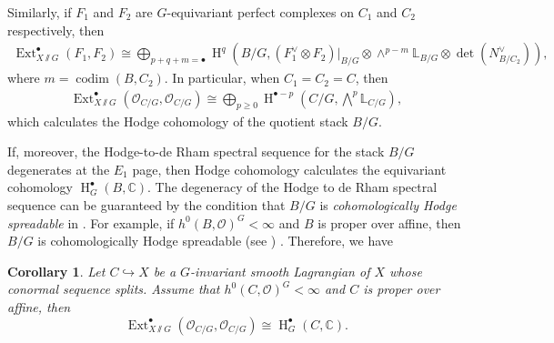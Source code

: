 \documentclass[12pt]{amsart}
\newtheorem{corollary}[theorem]{Corollary}
\theoremstyle{definition}
\theoremstyle{remark}
\numberwithin{equation}{section}
\newcommand{\CC}{\mathbb{C}}
\newcommand{\LL}{\mathbb{L}}
\newcommand{\TT}{\mathbb{T}}
\newcommand{\shO}{\mathcal{O}}
\newcommand{\codim}{\operatorname{codim}}
\newcommand{\Ext}{\operatorname{Ext}}
\newcommand{\Sym}{\operatorname{Sym}}
\newcommand{\Hdot}{\operatorname{H}}
\begin{document}
Similarly, if $F_1$ and $F_2$ are $G$-equivariant perfect complexes on $C_1$ and $C_2$ respectively, then
\begin{align}\label{eq: generalexteq}
    \Ext^{\bullet}_{X\sslash  G}(F_1,F_2)\cong\bigoplus_{p+q+m=\bullet}
\Hdot^q(B/G, (F_1^{\vee}\otimes F_2)|_{B/G}\otimes \wedge^{p-m}\LL_{B/G}\otimes \det(N_{B/C_2}^{\vee})),
\end{align}
where $m=\codim(B, C_2)$.
In particular, when $C_1=C_2=C$, then 
\begin{align*}
\Ext_{X\sslash  G}^{\bullet}(\shO_{C/G},\shO_{C/G})\cong  \bigoplus_{p\geq 0} \Hdot^{\bullet-p}(C/G, \bigwedge^p \LL_{C/G}),
\end{align*}
which calculates the Hodge cohomology of the quotient stack $B/G$.

If, moreover, the Hodge-to-de Rham spectral sequence for the stack $B/G$ degenerates at the $E_1$ page, then Hodge cohomology calculates the equivariant cohomology $\Hdot^{\bullet}_G(B, \CC)$. The degeneracy of the Hodge to de Rham spectral sequence can be guaranteed by the condition that $B/G$ is \emph{cohomologically Hodge spreadable} in \cite{kubrak2022hodge}. For example, if $h^0(B, \shO)^G<\infty$ and $B$ is proper over affine, then $B/G$ is cohomologically Hodge spreadable (see \cite[Example 3.1.6]{kubrak2022hodge}) . Therefore, we have 
\begin{corollary}\label{symredext}
    Let $C\hookrightarrow X$ be a $G$-invariant smooth Lagrangian of $X$ whose conormal sequence splits. Assume that $h^0(C, \shO)^G<\infty$ and $C$ is proper over affine, then 
    $$ \Ext_{X\sslash  G}^{\bullet}(\shO_{C/G}, \shO_{C/G})\cong \Hdot^{\bullet}_G(C,\CC).$$
\end{corollary}





\end{document}
